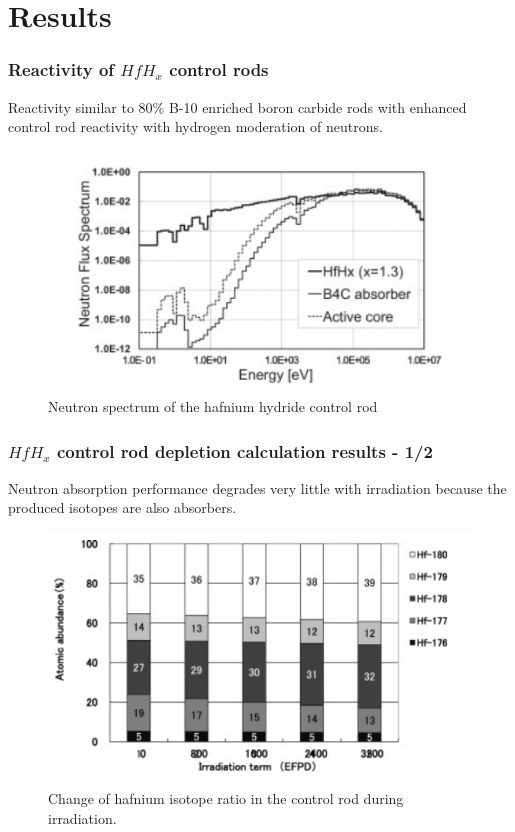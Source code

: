 \documentclass[9pt]{beamer}
\newcommand{\hfh}{$HfH_{x}$\xspace}
\begin{document}
\section{Results}



\begin{frame}
\frametitle{Reactivity of \hfh control rods}
Reactivity similar to 80\% B-10 enriched boron carbide rods with
enhanced control rod reactivity with hydrogen moderation of neutrons.
\begin{figure}[htbp!]
  \begin{center}
      \includegraphics[scale=0.5]{./images/spectrum.png}
  \end{center}
  \caption{Neutron spectrum of the hafnium hydride control rod}
  \label{fig:spec}
\end{figure}
\end{frame}

\begin{frame}
\frametitle{\hfh control rod depletion calculation results - 1/2}
Neutron absorption performance degrades very little with irradiation
because the produced isotopes are also absorbers.
\begin{figure}[htbp!]
  \begin{center}
      \includegraphics[scale=0.5]{./images/irrad_isotope.png}
  \end{center}
  \caption{Change of hafnium isotope ratio in the control rod during irradiation.}
  \label{fig:irrad_iso}
\end{figure}
\end{frame}
\end{document}
